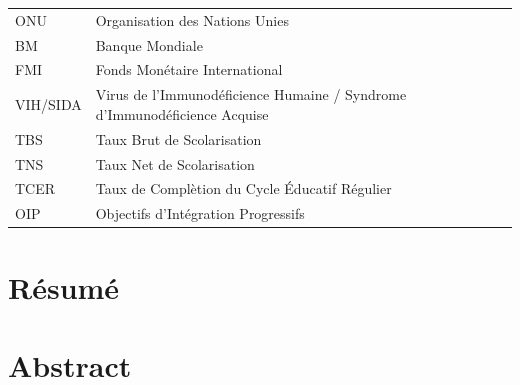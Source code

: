 \begin{table}[H]
\begin{tabularx}{\textwidth}{l l}
		ONU & Organisation des Nations Unies \\
		\rowcolor[HTML]{F5F8FC}
		BM & Banque Mondiale \\
		\rowcolor[HTML]{E8F0FF}
		FMI & Fonds Monétaire International \\
		\rowcolor[HTML]{F5F8FC}
		VIH/SIDA & Virus de l'Immunodéficience Humaine / Syndrome d'Immunodéficience Acquise \\
		\rowcolor[HTML]{E8F0FF}
		TBS & Taux Brut de Scolarisation \\
		\rowcolor[HTML]{F5F8FC}
		TNS & Taux Net de Scolarisation \\
		\rowcolor[HTML]{E8F0FF}
		TCER & Taux de Complètion du Cycle Éducatif Régulier \\
		\rowcolor[HTML]{F5F8FC}
		OIP & Objectifs d'Intégration Progressifs \\
	\end{tabularx}
\end{table}




\chapter*{Résumé}


\chapter*{Abstract}



